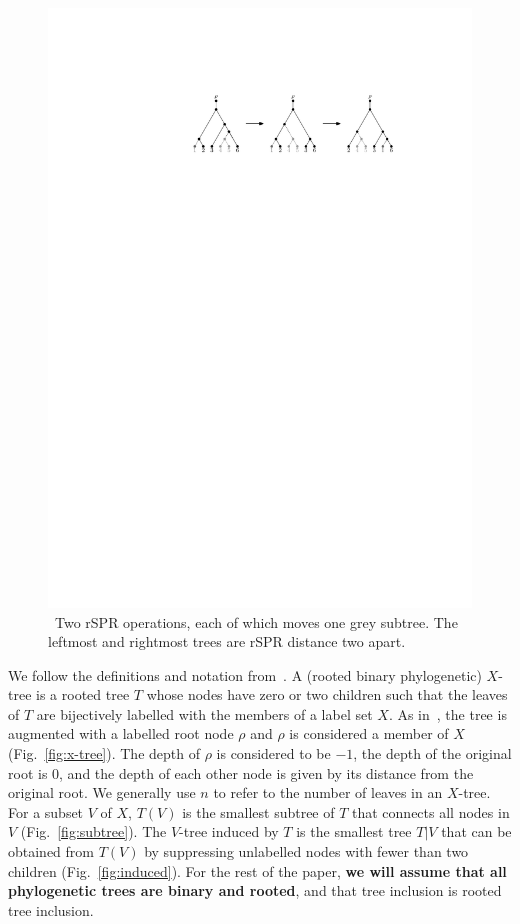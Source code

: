 \documentclass[]{elsarticle}
\let\MYoriglatexcaption\caption
\renewcommand{\caption}[2][\relax]{\MYoriglatexcaption[#2]{#2}}
\begin{document}
\begin{figure}
	\includegraphics[scale=1.25]{figs/two-spr}
	\caption{\
    Two rSPR operations, each of which moves one grey subtree.
    The leftmost and rightmost trees are rSPR distance two apart.}
	\label{fig:two-spr}
\end{figure}


We follow the definitions and notation from~\citep{bordewich05,whidden2013hybridization, Whidden2015-yi}.
A (rooted binary phylogenetic) $X$-tree is a rooted tree $T$ whose nodes have zero or two children such that the leaves of $T$ are bijectively labelled with the members of a label set $X$.
As in~\citep{bordewich05,whidden2013hybridization,Whidden2015-yi}, the tree is augmented with a labelled root node $\rho$ and $\rho$ is considered a member of $X$ (Fig.~\ref{fig:x-tree}).
The depth of $\rho$ is considered to be $-1$, the depth of the original root is 0, and the depth of each other node is given by its distance from the original root.
We generally use $n$ to refer to the number of leaves in an $X$-tree.
For a subset $V$ of $X$, $T(V)$ is the smallest subtree of $T$ that connects all nodes in $V$ (Fig.~\ref{fig:subtree}).
The $V$-tree induced by $T$ is the smallest tree $T|V$ that can be obtained from $T(V)$ by suppressing unlabelled nodes with fewer than two children (Fig.~\ref{fig:induced}).
For the rest of the paper, \textbf{we will assume that all phylogenetic trees are binary and rooted}, and that tree inclusion is rooted tree inclusion.
\end{document}
